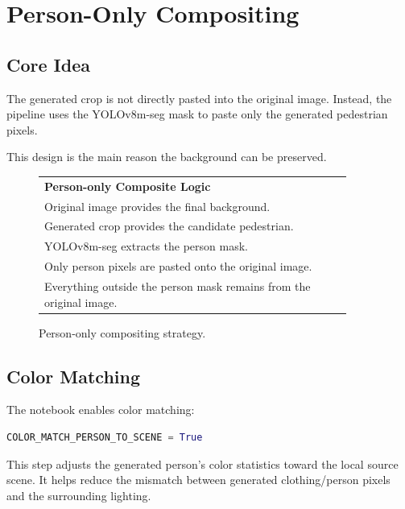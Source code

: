 \documentclass[12pt,a4paper]{article}
\begin{document}
\section{Person-Only Compositing}

\subsection{Core Idea}

The generated crop is not directly pasted into the original image. Instead, the
pipeline uses the YOLOv8m-seg mask to paste only the generated pedestrian pixels.

This design is the main reason the background can be preserved.

\begin{figure}[H]
\centering
\begin{tabular}{|p{0.9\linewidth}|}
\hline
\textbf{Person-only Composite Logic} \\[4pt]
Original image provides the final background. \\
Generated crop provides the candidate pedestrian. \\
YOLOv8m-seg extracts the person mask. \\
Only person pixels are pasted onto the original image. \\
Everything outside the person mask remains from the original image. \\
\hline
\end{tabular}
\caption{Person-only compositing strategy.}
\end{figure}

\subsection{Color Matching}

The notebook enables color matching:

\begin{lstlisting}[language=Python,caption={Current color matching flag}]
COLOR_MATCH_PERSON_TO_SCENE = True
\end{lstlisting}

This step adjusts the generated person's color statistics toward the local
source scene. It helps reduce the mismatch between generated clothing/person
pixels and the surrounding lighting.
\end{document}
